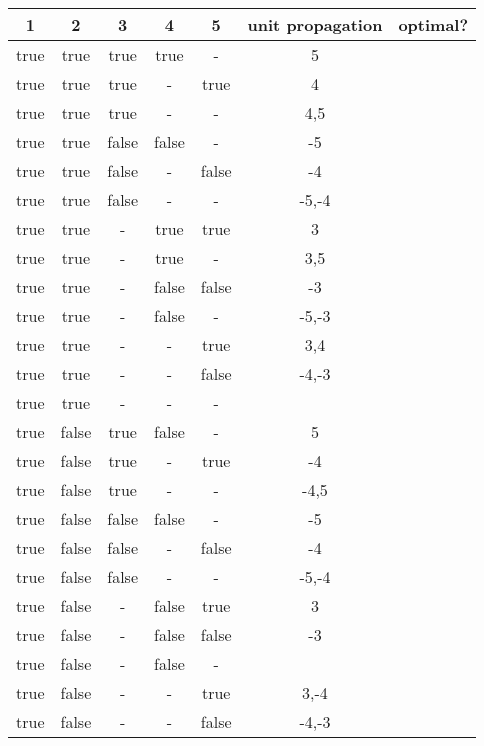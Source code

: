 \begin{longtable}{|c|c|c|c|c|c|c|}
\hline 1 & 2 & 3 & 4 & 5 & unit propagation & optimal? \\ \hline 
true & true & true & true & - & 5               &    \\ \hline 
true & true & true & - & true & 4               &    \\ \hline 
true & true & true & - & - & 4,5             &    \\ \hline 
true & true & false & false & - & -5              &    \\ \hline 
true & true & false & - & false & -4              &    \\ \hline 
true & true & false & - & - & -5,-4           &    \\ \hline 
true & true & - & true & true & 3               &    \\ \hline 
true & true & - & true & - & 3,5             &    \\ \hline 
true & true & - & false & false & -3              &    \\ \hline 
true & true & - & false & - & -5,-3           &    \\ \hline 
true & true & - & - & true & 3,4             &    \\ \hline 
true & true & - & - & false & -4,-3           &    \\ \hline 
true & true & - & - & - &                 &    \\ \hline 
true & false & true & false & - & 5               &    \\ \hline 
true & false & true & - & true & -4              &    \\ \hline 
true & false & true & - & - & -4,5            &    \\ \hline 
true & false & false & false & - & -5              &    \\ \hline 
true & false & false & - & false & -4              &    \\ \hline 
true & false & false & - & - & -5,-4           &    \\ \hline 
true & false & - & false & true & 3               &    \\ \hline 
true & false & - & false & false & -3              &    \\ \hline 
true & false & - & false & - &                 &    \\ \hline 
true & false & - & - & true & 3,-4            &    \\ \hline 
true & false & - & - & false & -4,-3           &    \\ \hline 

\end{longtable}
